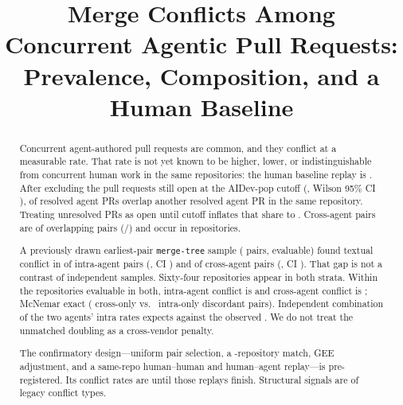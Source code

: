 \documentclass[10pt,conference]{IEEEtran}
\begin{document}
\title{Merge Conflicts Among Concurrent Agentic Pull Requests:\\Prevalence, Composition, and a Human Baseline}

\author{
}

\maketitle

\begin{abstract}
Concurrent agent-authored pull requests are common, and they conflict at a measurable rate. That rate is not yet known to be higher, lower, or indistinguishable from concurrent human work in the same repositories: the human baseline replay is \WPFourStatus. After excluding the \OpenShareFrac{} pull requests still open at the AIDev-pop cutoff (\OpenShare, Wilson 95\% CI \OpenShareCI), \PrShareB{} of resolved agent PRs overlap another resolved agent PR in the same repository. Treating unresolved PRs as open until cutoff inflates that share to \PrShareA. Cross-agent pairs are \CrossPairShare{} of overlapping pairs (\CrossPairN/\CrossPairDenom) and occur in \NReposCross{} repositories.

A previously drawn earliest-pair \texttt{merge-tree} sample (\LegacyAttempted{} pairs, \LegacyEvaluable{} evaluable) found textual conflict in \LegacyIntraRate{} of intra-agent pairs (\LegacyIntraFrac, CI \LegacyIntraCI) and \LegacyCrossRate{} of cross-agent pairs (\LegacyCrossFrac, CI \LegacyCrossCI). That gap is not a contrast of independent samples. Sixty-four repositories appear in both strata. Within the \LegacySharedEval{} repositories evaluable in both, intra-agent conflict is \LegacyMatchedIntra{} and cross-agent conflict is \LegacyMatchedCross{}; McNemar exact \LegacyMcNemarP{} (\LegacyCrossOnly{} cross-only vs.\ \LegacyIntraOnly{} intra-only discordant pairs). Independent combination of the two agents' intra rates expects \LegacyExpectedCross{} against the observed \LegacyObservedCross. We do not treat the unmatched doubling as a cross-vendor penalty.

The confirmatory design---uniform pair selection, a \NReposMatched-repository match, GEE adjustment, and a same-repo human--human and human--agent replay---is pre-registered. Its conflict rates are \WPThreeStatus{} until those replays finish. Structural signals are \LegacyStructural{} of legacy conflict types.
\end{abstract}
\end{document}
